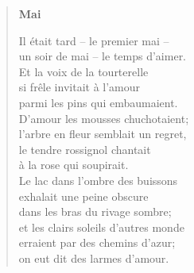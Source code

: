 \begin{verse}
% 
% 
% 
% 
% 


\bigskip

\textbf{Mai}

\smallskip

Il était tard -- le premier mai -- \\
un soir de mai -- le temps d'aimer. \\
Et la voix de la tourterelle \\
si frêle invitait à l'amour \\
parmi les pins qui embaumaient. \\
D'amour les mousses chuchotaient; \\
l'arbre en fleur semblait un regret, \\
le tendre rossignol chantait \\
à la rose qui soupirait. \\
Le lac dans l'ombre des buissons \\
exhalait une peine obscure \\
dans les bras du rivage sombre; \\
et les clairs soleils d'autres monde \\
erraient par des chemins d'azur; \\
on eut dit des larmes d'amour.

\smallskip



\end{verse}
